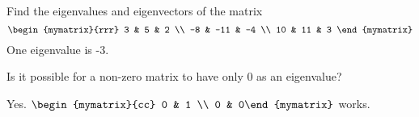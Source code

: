 \begin{enumialphparenastyle}
\begin{ex} Find the eigenvalues and eigenvectors of the matrix  
\begin{equation*}
\begin{mymatrix}{rrr}
3 & 5 & 2 \\
-8 & -11 & -4 \\
10 & 11 & 3
\end{mymatrix}
\end{equation*}
One eigenvalue is -3. 
\end{ex}

\begin{ex} Is it possible for a non-zero matrix to have only $0$ as an eigenvalue?
\vspace{1mm} 
\begin{sol}
Yes. $\begin{mymatrix}{cc}
0 & 1 \\
0 & 0%
\end{mymatrix} $ works.
\end{sol}
\end{ex}

\end{enumialphparenastyle}